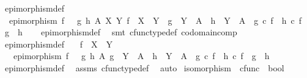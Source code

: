 \begin{isabellebody}
\isanewline
{}\isamarkupfalse%
\ epimorphism{\isacharunderscore}{\kern0pt}def{}{\isacharcolon}{\kern0pt}\isanewline
\ \ {\isachardoublequoteopen}epimorphism\ f\ {\isasymlongleftrightarrow}\ {\isacharparenleft}{\kern0pt}{\isasymforall}\ g\ h\ A\ X\ Y{\isachardot}{\kern0pt}\ f\ {\isacharcolon}{\kern0pt}\ X\ {\isasymrightarrow}\ Y\ {\isasymand}\ g\ {\isacharcolon}{\kern0pt}\ Y\ {\isasymrightarrow}\ A\ {\isasymand}\ h\ {\isacharcolon}{\kern0pt}\ Y\ {\isasymrightarrow}\ A\ {\isasymlongrightarrow}\ {\isacharparenleft}{\kern0pt}g\ {\isasymcirc}\isactrlsub c\ f\ {\isacharequal}{\kern0pt}\ h\ {\isasymcirc}\isactrlsub c\ f\ {\isasymlongrightarrow}\ g\ {\isacharequal}{\kern0pt}\ h{\isacharparenright}{\kern0pt}{\isacharparenright}{\kern0pt}{\isachardoublequoteclose}\isanewline
%
\isadelimproof
\ \ %
\endisadelimproof
%
\isatagproof
{}\isamarkupfalse%
\ epimorphism{\isacharunderscore}{\kern0pt}def\ \isamarkupfalse%
\ {\isacharparenleft}{\kern0pt}smt\ cfunc{\isacharunderscore}{\kern0pt}type{\isacharunderscore}{\kern0pt}def\ codomain{\isacharunderscore}{\kern0pt}comp{\isacharparenright}{\kern0pt}%
\endisatagproof
{\isafoldproof}%
%
\isadelimproof
\ \isanewline
%
\endisadelimproof
\isanewline
{}\isamarkupfalse%
\ epimorphism{\isacharunderscore}{\kern0pt}def{}{\isacharcolon}{\kern0pt}\isanewline
\ \ \ {\isachardoublequoteopen}f\ {\isacharcolon}{\kern0pt}\ X\ {\isasymrightarrow}\ Y{\isachardoublequoteclose}\isanewline
\ \ \ {\isachardoublequoteopen}epimorphism\ f\ {\isasymlongleftrightarrow}\ {\isacharparenleft}{\kern0pt}{\isasymforall}\ g\ h\ A{\isachardot}{\kern0pt}\ g\ {\isacharcolon}{\kern0pt}\ Y\ {\isasymrightarrow}\ A\ {\isasymand}\ h\ {\isacharcolon}{\kern0pt}\ Y\ {\isasymrightarrow}\ A\ {\isasymlongrightarrow}\ {\isacharparenleft}{\kern0pt}g\ {\isasymcirc}\isactrlsub c\ f\ {\isacharequal}{\kern0pt}\ h\ {\isasymcirc}\isactrlsub c\ f\ {\isasymlongrightarrow}\ g\ {\isacharequal}{\kern0pt}\ h{\isacharparenright}{\kern0pt}{\isacharparenright}{\kern0pt}{\isachardoublequoteclose}\isanewline
%
\isadelimproof
\ \ %
\endisadelimproof
%
\isatagproof
{}\isamarkupfalse%
\ epimorphism{\isacharunderscore}{\kern0pt}def{}\ \isamarkupfalse%
\ assms\ cfunc{\isacharunderscore}{\kern0pt}type{\isacharunderscore}{\kern0pt}def\ \isamarkupfalse%
\ auto%
\endisatagproof
{\isafoldproof}%
%
\isadelimproof
\isanewline
%
\endisadelimproof
\isanewline
{}\isamarkupfalse%
\ isomorphism\ {\isacharcolon}{\kern0pt}{\isacharcolon}{\kern0pt}\ {\isachardoublequoteopen}cfunc\ {\isasymRightarrow}\ bool{\isachardoublequoteclose}\ \isanewline

\end{isabellebody}
